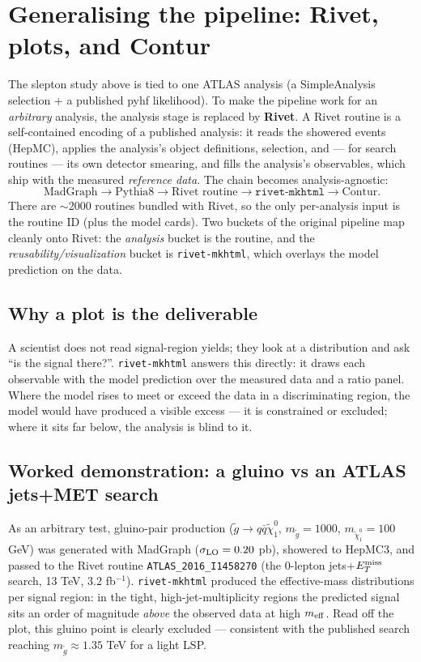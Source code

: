 \documentclass[11pt,oneside]{report}
\newcommand{\code}[1]{\texttt{#1}}
\begin{document}
\chapter{Generalising the pipeline: Rivet, plots, and Contur}
The slepton study above is tied to one ATLAS analysis (a SimpleAnalysis selection + a published
pyhf likelihood). To make the pipeline work for an \emph{arbitrary} analysis, the analysis stage is
replaced by \textbf{Rivet}. A Rivet routine is a self-contained encoding of a published analysis: it
reads the showered events (HepMC), applies the analysis's object definitions, selection, and --- for
search routines --- its own detector smearing, and fills the analysis's observables, which ship with
the measured \emph{reference data}. The chain becomes analysis-agnostic:
\[
\text{MadGraph} \to \text{Pythia8} \to \text{Rivet routine} \to \texttt{rivet-mkhtml} \to \text{Contur}.
\]
There are $\sim$2000 routines bundled with Rivet, so the only per-analysis input is the routine ID
(plus the model cards). Two buckets of the original pipeline map cleanly onto Rivet: the
\emph{analysis} bucket is the routine, and the \emph{reusability/visualization} bucket is
\code{rivet-mkhtml}, which overlays the model prediction on the data.

\section{Why a plot is the deliverable}
A scientist does not read signal-region yields; they look at a distribution and ask ``is the signal
there?''. \code{rivet-mkhtml} answers this directly: it draws each observable with the model
prediction over the measured data and a ratio panel. Where the model rises to meet or exceed the
data in a discriminating region, the model would have produced a visible excess --- it is
constrained or excluded; where it sits far below, the analysis is blind to it.

\section{Worked demonstration: a gluino vs an ATLAS jets+MET search}
As an arbitrary test, gluino-pair production ($\tilde g \to q\bar q \tilde\chi^0_1$, $m_{\tilde
g}=1000$, $m_{\tilde\chi^0_1}=100$ GeV) was generated with MadGraph ($\sigma_{\rm LO}=0.20$ pb),
showered to HepMC3, and passed to the Rivet routine \code{ATLAS\_2016\_I1458270} (the 0-lepton
jets+$E_T^{\rm miss}$ search, 13 TeV, 3.2 fb$^{-1}$). \code{rivet-mkhtml} produced the effective-mass
distributions per signal region: in the tight, high-jet-multiplicity regions the predicted signal
sits an order of magnitude \emph{above} the observed data at high $m_{\rm eff}$. Read off the plot,
this gluino point is clearly excluded --- consistent with the published search reaching
$m_{\tilde g}\approx1.35$ TeV for a light LSP.
\end{document}
